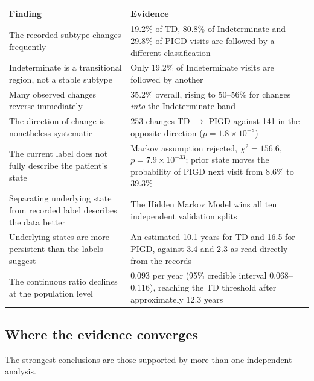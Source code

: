 \documentclass[11pt,a4paper]{article}
\begin{document}
\begin{table}[H]
\centering
\small
\begin{tabular}{@{}p{7.9cm}p{7.9cm}@{}}
\toprule
\textbf{Finding} & \textbf{Evidence} \\
\midrule
The recorded subtype changes frequently &
19.2\% of TD, 80.8\% of Indeterminate and 29.8\% of PIGD visits are followed by
a different classification \\
\addlinespace
Indeterminate is a transitional region, not a stable subtype &
Only 19.2\% of Indeterminate visits are followed by another \\
\addlinespace
Many observed changes reverse immediately &
35.2\% overall, rising to 50--56\% for changes \emph{into} the Indeterminate
band \\
\addlinespace
The direction of change is nonetheless systematic &
253 changes TD $\rightarrow$ PIGD against 141 in the opposite direction
($p = 1.8\times10^{-8}$) \\
\addlinespace
The current label does not fully describe the patient's state &
Markov assumption rejected, $\chi^2 = 156.6$, $p = 7.9\times10^{-33}$; prior
state moves the probability of PIGD next visit from 8.6\% to 39.3\% \\
\addlinespace
Separating underlying state from recorded label describes the data better &
The Hidden Markov Model wins all ten independent validation splits \\
\addlinespace
Underlying states are more persistent than the labels suggest &
An estimated 10.1 years for TD and 16.5 for PIGD, against 3.4 and 2.3 as read
directly from the records \\
\addlinespace
The continuous ratio declines at the population level &
$0.093$ per year (95\% credible interval $0.068$--$0.116$), reaching the TD
threshold after approximately 12.3 years \\
\bottomrule
\end{tabular}
\end{table}

\subsection{Where the evidence converges}

The strongest conclusions are those supported by more than one independent
analysis.
\end{document}
